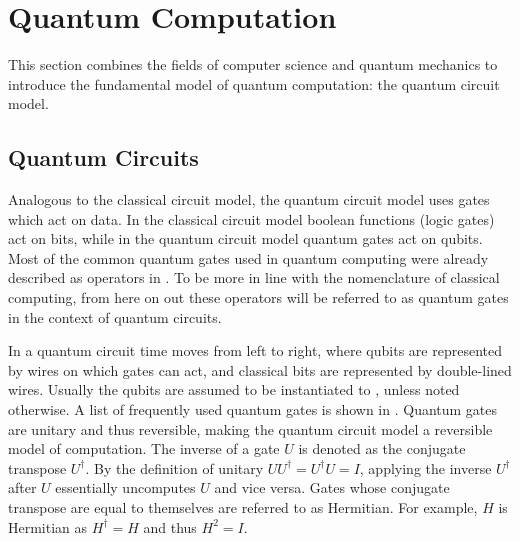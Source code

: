 \section{Quantum Computation}
This section combines the fields of computer science and quantum mechanics to introduce the fundamental model of quantum computation: the quantum circuit model.

\subsection{Quantum Circuits}
Analogous to the classical circuit model, the quantum circuit model uses gates which act on data.
In the classical circuit model boolean functions (logic gates) act on bits, while in the quantum circuit model quantum gates act on qubits.
Most of the common quantum gates used in quantum computing were already described as operators in .
To be more in line with the nomenclature of classical computing, from here on out these operators will be referred to as quantum gates in the context of quantum circuits.

In a quantum circuit time moves from left to right, where qubits are represented by wires on which gates can act, and classical bits are represented by double-lined wires.
Usually the qubits are assumed to be instantiated to , unless noted otherwise.
A list of frequently used quantum gates is shown in .
Quantum gates are unitary and thus reversible, making the quantum circuit model a reversible model of computation.
The inverse of a gate $U$ is denoted as the conjugate transpose $U^\dagger$.
By the definition of unitary $UU^\dagger = U^\dagger U = I$, applying the inverse $U^\dagger$ after $U$ essentially uncomputes $U$ and vice versa.
Gates whose conjugate transpose are equal to themselves are referred to as Hermitian.
For example, $H$ is Hermitian as $H^\dagger = H$ and thus $H^2 = I$.


